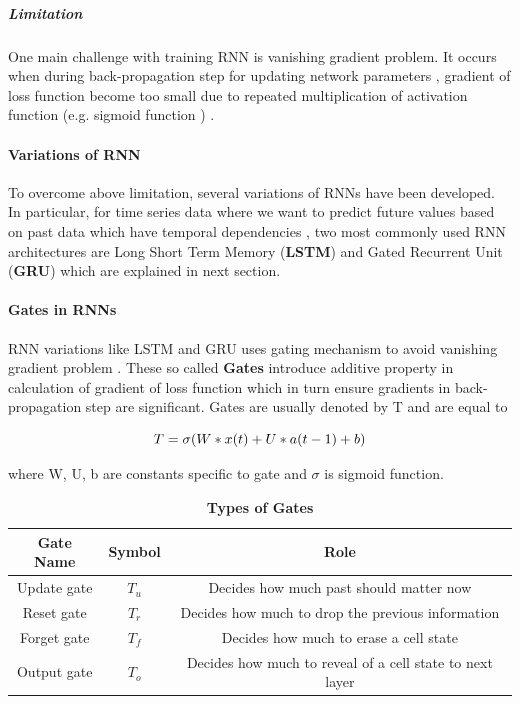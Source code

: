\documentclass{article}
\begin{document}
\subparagraph{Limitation} One main challenge with training RNN is vanishing gradient problem. It occurs when during back-propagation step for updating network parameters , gradient of loss function become too small due to repeated multiplication of activation function (e.g. sigmoid function ) . 


\paragraph{Variations of RNN} To overcome above limitation, several variations of RNNs have been developed. In particular, for time series data where we want to predict future values based on past data which have temporal dependencies , two most commonly used RNN architectures are Long Short Term Memory (\textbf{LSTM}) and Gated Recurrent Unit (\textbf{GRU}) which are explained in next section. 

\paragraph{Gates in RNNs} RNN variations like LSTM and GRU uses gating mechanism to avoid vanishing gradient problem . These so called \textbf{Gates} introduce additive property in calculation of gradient of loss function which in turn ensure gradients in back-propagation step are significant. Gates are usually denoted by T and are equal to 


\begin{center}
\begin{tcolorbox}[colframe=orange,boxsep=5pt,boxrule=1pt,colback=white, width=0.6\linewidth]
\begin{equation*}
	\centering 
	T = \sigma ( W * x (t)  + U * a(t-1) + b )
\end{equation*}
\end{tcolorbox}
\end{center}


where W, U, b are constants specific to gate and $\sigma$ is sigmoid function. 


\vspace{2em}
\begin{table}[h]
	\centering
	\caption{\textbf{Types of Gates}}
	\begin{tabular}{|c| c | c|}
		\hline
		\textbf{Gate Name} & \textbf{Symbol} & \textbf{Role} \\
		\hline
		Update gate & $T_u$ & Decides how much past should matter now \\
		\hline 
		Reset gate & $T_r$ & Decides how much to drop the previous information \\
		\hline 
		Forget gate & $T_f$ & Decides how much to erase a cell state \\
		\hline 
		Output gate &  $T_o$ & Decides how much to reveal of a cell state to next layer \\
		\hline
	\end{tabular}
\end{table}
\end{document}
